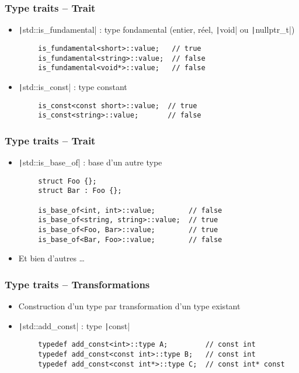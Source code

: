 \documentclass[C++.tex]{subfiles}
\begin{document}
\begin{frame}[fragile]
	\frametitle{Type traits -- Trait}
	\begin{itemize}
		\item \texttt|std::is_fundamental| : type fondamental (entier, réel, \texttt|void| ou \texttt|nullptr_t|)
	\end{itemize}

	\begin{verbatim}
		is_fundamental<short>::value;   // true
		is_fundamental<string>::value;  // false
		is_fundamental<void*>::value;   // false
	\end{verbatim}

	\begin{itemize}
		\item \texttt|std::is_const| : type constant
	\end{itemize}

	\begin{verbatim}
		is_const<const short>::value;  // true
		is_const<string>::value;       // false
	\end{verbatim}
\end{frame}

\begin{frame}[fragile]
	\frametitle{Type traits -- Trait}
	\begin{itemize}
		\item \texttt|std::is_base_of| : base d'un autre type
	\end{itemize}

	\begin{verbatim}
		struct Foo {};
		struct Bar : Foo {};

		is_base_of<int, int>::value;        // false
		is_base_of<string, string>::value;  // true
		is_base_of<Foo, Bar>::value;        // true
		is_base_of<Bar, Foo>::value;        // false
	\end{verbatim}

	\begin{itemize}
		\item Et bien d'autres \ldots{}
	\end{itemize}
\end{frame}

\begin{frame}[fragile]
	\frametitle{Type traits -- Transformations}
	\begin{itemize}
		\item Construction d'un type par transformation d'un type existant
		\item \texttt|std::add_const| : type \texttt|const|
	\end{itemize}

	\begin{verbatim}
		typedef add_const<int>::type A;         // const int
		typedef add_const<const int>::type B;   // const int
		typedef add_const<const int*>::type C;  // const int* const
	\end{verbatim}
\end{frame}
\end{document}
